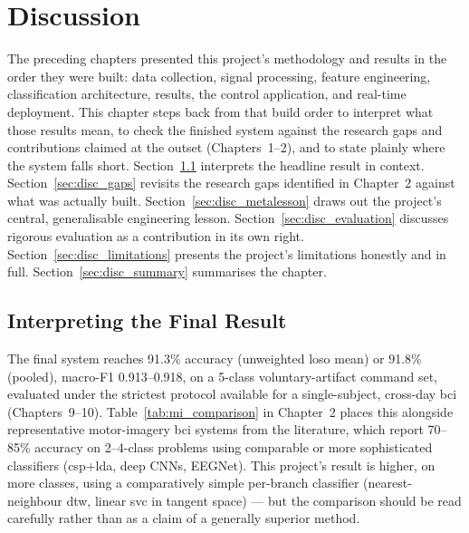 \chapter{Discussion}
\label{ch:discussion}

The preceding chapters presented this project's methodology and
results in the order they were built: data collection, signal
processing, feature engineering, classification architecture,
results, the control application, and real-time deployment. This
chapter steps back from that build order to interpret what those
results mean, to check the finished system against the research
gaps and contributions claimed at the outset (Chapters~1--2), and
to state plainly where the system falls short. Section~\ref{sec:disc_interpretation}
interprets the headline result in context. Section~\ref{sec:disc_gaps}
revisits the research gaps identified in Chapter~2 against what was
actually built. Section~\ref{sec:disc_metalesson} draws out the
project's central, generalisable engineering lesson.
Section~\ref{sec:disc_evaluation} discusses rigorous evaluation as a
contribution in its own right. Section~\ref{sec:disc_limitations}
presents the project's limitations honestly and in full.
Section~\ref{sec:disc_summary} summarises the chapter.

\section{Interpreting the Final Result}
\label{sec:disc_interpretation}

The final system reaches 91.3\% accuracy (unweighted \acrshort{loso}
mean) or 91.8\% (pooled), macro-F1 0.913--0.918, on a 5-class
voluntary-artifact command set, evaluated under the strictest
protocol available for a single-subject, cross-day \acrshort{bci}
(Chapters~9--10). Table~\ref{tab:mi_comparison} in Chapter~2 places
this alongside representative motor-imagery \acrshort{bci} systems
from the literature, which report 70--85\% accuracy on 2--4-class
problems using comparable or more sophisticated classifiers
(\acrshort{csp}+\acrshort{lda}, deep CNNs, EEGNet). This project's
result is higher, on more classes, using a comparatively simple
per-branch classifier (nearest-neighbour \acrshort{dtw}, linear
\acrshort{svc} in tangent space) --- but the comparison should be
read carefully rather than as a claim of a generally superior
method.

